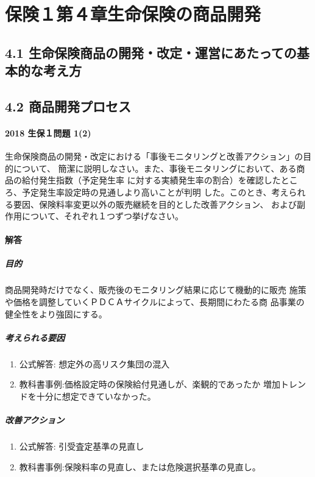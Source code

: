 \documentclass[report,gutter=10mm,fore-edge=10mm,uplatex,dvipdfmx]{jlreq}
\begin{document}
\chapter{保険１第４章生命保険の商品開発}
\section{4.1 生命保険商品の開発・改定・運営にあたっての基本的な考え方}
\section{4.2 商品開発プロセス}
\subsubsection{2018 生保１問題 1(2)}
生命保険商品の開発・改定における「事後モニタリングと改善アクション」の目的について、
簡潔に説明しなさい。また、事後モニタリングにおいて、ある商品の給付発生指数（予定発生率
に対する実績発生率の割合）を確認したところ、予定発生率設定時の見通しより高いことが判明
した。このとき、考えられる要因、保険料率変更以外の販売継続を目的とした改善アクション、
および副作用について、それぞれ１つずつ挙げなさい。

\subsubsection{解答}
\paragraph{目的}
商品開発時だけでなく、販売後のモニタリング結果に応じて機動的に販売
施策や価格を調整していくＰＤＣＡサイクルによって、長期間にわたる商
品事業の健全性をより強固にする。\\

\paragraph{考えられる要因}
\begin{enumerate}
 \item 公式解答: 想定外の高リスク集団の混入 
 \item 教科書事例:価格設定時の保険給付見通しが、楽観的であったか
増加トレンドを十分に想定できていなかった。
\end{enumerate}

\paragraph{改善アクション}
\begin{enumerate}
 \item 公式解答: 引受査定基準の見直し
 \item 教科書事例:保険料率の見直し、または危険選択基準の見直し。
\end{enumerate}
\end{document}
